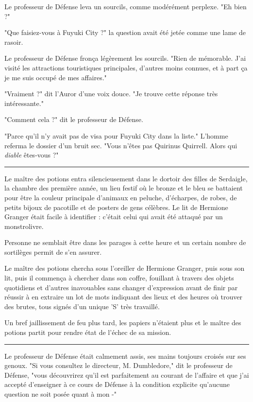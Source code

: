 Le professeur de Défense leva un sourcils, comme modérément perplexe. "Eh bien ?"

"Que faisiez-vous à Fuyuki City ?" la question avait été jetée comme une lame de rasoir.

Le professeur de Défense fronça légèrement les sourcils. "Rien de mémorable. J'ai visité les attractions touristiques principales, d'autres moins connues, et à part ça je me suis occupé de mes affaires."

"Vraiment ?" dit l'Auror d'une voix douce. "Je trouve cette réponse très intéressante."

"Comment cela ?" dit le professeur de Défense.

"Parce qu'il n'y avait pas de visa pour Fuyuki City dans la liste." L'homme referma le dossier d'un bruit sec. "Vous n'êtes pas Quirinus Quirrell. Alors qui \emph{diable}  êtes-vous ?"
\par\noindent\rule{\textwidth}{0.4pt}
Le maître des potions entra silencieusement dans le dortoir des filles de Serdaigle, la chambre des première année, un lieu festif où le bronze et le bleu se battaient pour être la couleur principale d'animaux en peluche, d'écharpes, de robes, de petits bijoux de pacotille et de posters de gens célèbres. Le lit de Hermione Granger était facile à identifier : c'était celui qui avait été attaqué par un monstrolivre.

Personne ne semblait être dans les parages à cette heure et un certain nombre de sortilèges permit de s'en assurer.

Le maître des potions chercha sous l'oreiller de Hermione Granger, puis sous son lit, puis il commença à chercher dans son coffre, fouillant à travers des objets quotidiens et d'autres inavouables sans changer d'expression avant de finir par réussir à en extraire un lot de mots indiquant des lieux et des heures où trouver des brutes, tous signés d'un unique 'S' très travaillé.

Un bref jaillissement de feu plus tard, les papiers n'étaient plus et le maître des potions partit pour rendre état de l'échec de sa mission.
\par\noindent\rule{\textwidth}{0.4pt}
Le professeur de Défense était calmement assis, ses mains toujours croisés sur ses genoux. "Si vous consultez le directeur, M. Dumbledore," dit le professeur de Défense, "vous découvrirez qu'il est parfaitement au courant de l'affaire et que j'ai accepté d'enseigner à ce cours de Défense à la condition explicite qu'aucune question ne soit posée quant à mon -"

